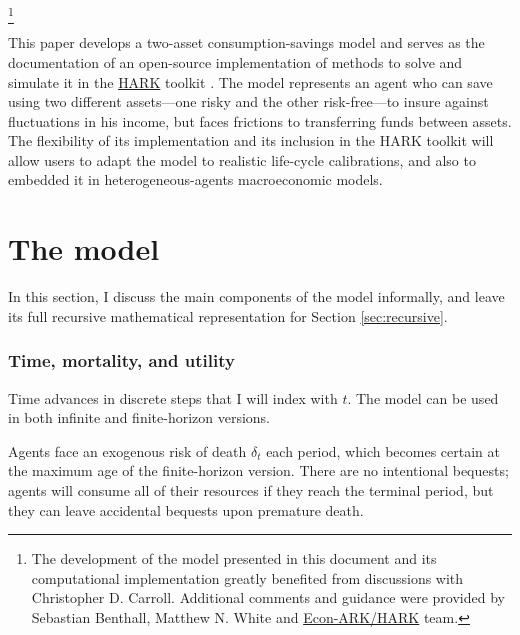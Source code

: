 \documentclass[./RiskyContrib.tex]{subfiles}
\begin{document}
\begin{authorsinfo}
\end{authorsinfo}

\thanks{
The development of the model presented in this document and its computational implementation
greatly benefited from discussions with Christopher D. Carroll. Additional comments and guidance
were provided by Sebastian Benthall, Matthew N. White and \href{https://econ-ark/HARK}{Econ-ARK/HARK}
team.
}

\titlepagefinish

This paper develops a two-asset consumption-savings model and serves as
the documentation of an open-source implementation of methods to solve and
simulate it in the \href{https://econ-ark.org/toolkit}{HARK}
toolkit \citep{carroll2018HARK}. The model represents an agent who can
save using two different assets---one risky and the other risk-free---to insure
against fluctuations in his income, but faces frictions to transferring funds between
assets. The flexibility of its implementation and its inclusion in the HARK
toolkit will allow users to adapt the model to realistic life-cycle calibrations, and
also to embedded it in heterogeneous-agents macroeconomic models.

\hypertarget{The model}{}
\section{The model}

In this section, I discuss the main components of the model informally, and leave its full
recursive mathematical representation for Section \ref{sec:recursive}.

\subsubsection{Time, mortality, and utility}

Time advances in discrete steps that I will index with $t$. The model can
be used in both infinite and finite-horizon versions.

Agents face an exogenous risk of death $\delta_t$ each period, which becomes certain at the 
maximum age of the finite-horizon version. There are no intentional bequests; agents
will consume all of their resources if they reach the terminal period, but they can leave
accidental bequests upon premature death.
\end{document}
